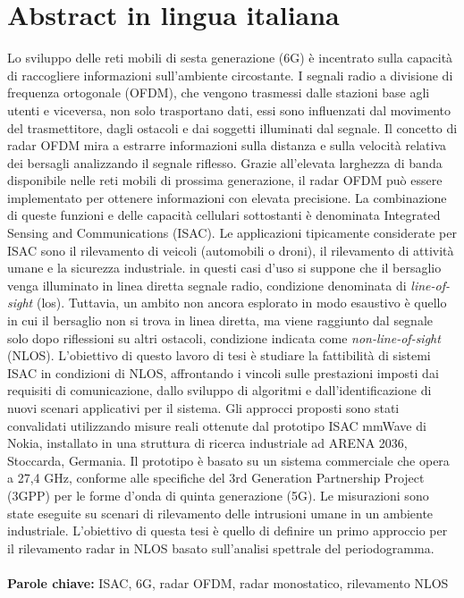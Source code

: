\documentclass{Configuration_Files/PoliMi3i_thesis}
\begin{document}
\chapter*{Abstract in lingua italiana}
Lo sviluppo delle reti mobili di sesta generazione (6G) è incentrato sulla capacità di raccogliere informazioni sull'ambiente circostante.
I segnali radio a divisione di frequenza ortogonale (OFDM), che vengono trasmessi dalle stazioni base agli utenti e viceversa, non solo trasportano dati, essi sono influenzati dal movimento del trasmettitore, dagli ostacoli e dai soggetti illuminati dal segnale.
Il concetto di radar OFDM mira a estrarre informazioni sulla distanza e sulla velocità relativa dei bersagli analizzando il segnale riflesso.
Grazie all'elevata larghezza di banda disponibile nelle reti mobili di prossima generazione, il radar OFDM può essere implementato per ottenere informazioni con elevata precisione.
La combinazione di queste funzioni e delle capacità cellulari sottostanti
è denominata Integrated Sensing and Communications (ISAC). Le applicazioni tipicamente considerate per ISAC sono il rilevamento di veicoli (automobili o droni), il rilevamento di attività umane e la sicurezza industriale.
in questi casi d'uso si suppone che il bersaglio venga illuminato in linea diretta segnale radio, condizione denominata di \textit{line-of-sight} (\gls{los}). Tuttavia, un ambito non ancora esplorato in modo esaustivo è quello in cui il bersaglio non si trova in linea diretta, ma viene raggiunto dal segnale solo dopo riflessioni su altri ostacoli, condizione indicata come \textit{non-line-of-sight} (NLOS).
L'obiettivo di questo lavoro di tesi è studiare la fattibilità di sistemi ISAC in condizioni di NLOS, affrontando i vincoli sulle prestazioni imposti dai requisiti di comunicazione, dallo sviluppo di algoritmi e dall'identificazione di nuovi scenari applicativi per il sistema.
Gli approcci proposti sono stati convalidati utilizzando misure reali
ottenute dal prototipo ISAC mmWave di Nokia, installato in
una struttura di ricerca industriale ad ARENA 2036, Stoccarda, Germania. 
Il prototipo è basato su un sistema commerciale che opera a 27,4 GHz, conforme alle specifiche del 3rd Generation Partnership Project (3GPP) per le forme d'onda di quinta generazione (5G).
Le misurazioni sono state eseguite su scenari di rilevamento delle intrusioni umane in un ambiente industriale. 
L'obiettivo di questa tesi è quello di definire un primo approccio per il rilevamento radar in NLOS basato sull'analisi spettrale del periodogramma.
\\
\\
\textbf{Parole chiave:} ISAC, 6G, radar OFDM, radar monostatico, rilevamento NLOS %
\end{document}
